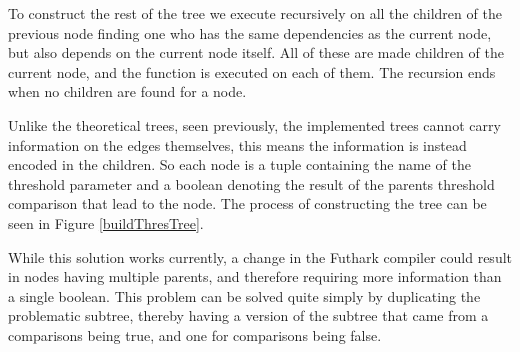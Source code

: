 To construct the rest of the tree we execute recursively on all the children
of the previous node finding one who has the same dependencies as the current
node, but also depends on the current node itself. All of these are made
children of the current node, and the function is executed on each of them. The
recursion ends when no children are found for a node.

Unlike the theoretical trees, seen previously, the implemented trees cannot carry information on
the edges themselves, this means the information is instead encoded in the
children. So each node is a tuple containing the name of the threshold
parameter and a boolean denoting the result of the parents threshold
comparison that lead to the node. The process of constructing the tree can be seen in Figure \ref{buildThresTree}.


While this solution works currently, a change in the Futhark compiler could
result in nodes having multiple parents, and therefore requiring more
information than a single boolean. This problem can be solved quite simply by
duplicating the problematic subtree, thereby having a version of the subtree that came from a
comparisons being true, and one for comparisons being false.


